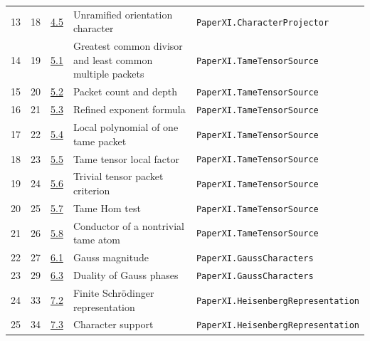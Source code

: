 \documentclass[10pt,oneside]{book}
\begin{document}
\begin{longtable}{@{}p{}p{}p{}>{\raggedright\arraybackslash}p{}p{}@{}}
13&18&\href{https://komorebi.invalid/b07/obligation_13}{4.5}&Unramified orientation character&\nolinkurl{PaperXI.CharacterProjector}\\

14&19&\href{https://komorebi.invalid/b07/obligation_14}{5.1}&Greatest common divisor and least common multiple packets&\nolinkurl{PaperXI.TameTensorSource}\\

15&20&\href{https://komorebi.invalid/b07/obligation_15}{5.2}&Packet count and depth&\nolinkurl{PaperXI.TameTensorSource}\\

16&21&\href{https://komorebi.invalid/b07/obligation_16}{5.3}&Refined exponent formula&\nolinkurl{PaperXI.TameTensorSource}\\

17&22&\href{https://komorebi.invalid/b07/obligation_17}{5.4}&Local polynomial of one tame packet&\nolinkurl{PaperXI.TameTensorSource}\\

18&23&\href{https://komorebi.invalid/b07/obligation_18}{5.5}&Tame tensor local factor&\nolinkurl{PaperXI.TameTensorSource}\\

19&24&\href{https://komorebi.invalid/b07/obligation_19}{5.6}&Trivial tensor packet criterion&\nolinkurl{PaperXI.TameTensorSource}\\

20&25&\href{https://komorebi.invalid/b07/obligation_20}{5.7}&Tame Hom test&\nolinkurl{PaperXI.TameTensorSource}\\

21&26&\href{https://komorebi.invalid/b07/obligation_21}{5.8}&Conductor of a nontrivial tame atom&\nolinkurl{PaperXI.TameTensorSource}\\

22&27&\href{https://komorebi.invalid/b07/obligation_22}{6.1}&Gauss magnitude&\nolinkurl{PaperXI.GaussCharacters}\\

23&29&\href{https://komorebi.invalid/b07/obligation_23}{6.3}&Duality of Gauss phases&\nolinkurl{PaperXI.GaussCharacters}\\

24&33&\href{https://komorebi.invalid/b07/obligation_24}{7.2}&Finite Schrödinger representation&\nolinkurl{PaperXI.HeisenbergRepresentation}\\

25&34&\href{https://komorebi.invalid/b07/obligation_25}{7.3}&Character support&\nolinkurl{PaperXI.HeisenbergRepresentation}\\


\end{longtable}
\end{document}
